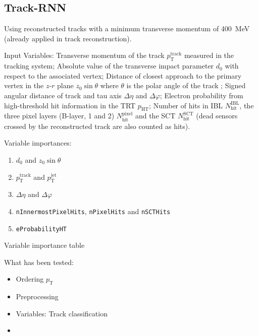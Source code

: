 \subsection{Track-RNN}
\label{sec:rnn_tracks}

Using reconstructed tracks with a minimum transverse momentum of
\SI{400}{\mega\electronvolt} (already applied in track reconstruction).

Input Variables: Transverse momentum of the track $p_\text{T}^\text{track}$
measured in the tracking system; Absolute value of the transverse impact
parameter $d_0$ with respect to the associated vertex; Distance of closest
approach to the primary vertex in the $z$-$r$ plane $z_0 \sin\theta$ where
$\theta$ is the polar angle of the track ; Signed angular distance of track and tau axis $\Delta \eta$ and
$\Delta \varphi$; Electron probability from high-threshold hit information in
the TRT $p_\text{HT}$; Number of hits in IBL $N_\text{hit}^\text{IBL}$, the
three pixel layers (B-layer, 1 and 2) $N_\text{hit}^\text{pixel}$ and the SCT
$N_\text{hit}^\text{SCT}$ (dead sensors crossed by the reconstructed track are
also counted as hits).

Variable importances:
\begin{enumerate}
\item $d_0$ and $z_0 \sin\theta$
\item $p_\text{T}^\text{track}$ and $p_\text{T}^\text{jet}$
\item $\Delta \eta$ and $\Delta \varphi$
\item \texttt{nInnermostPixelHits}, \texttt{nPixelHits} and \texttt{nSCTHits}
\item \texttt{eProbabilityHT}
\end{enumerate}

\begin{table}[ht]
  \centering
  
  \caption{Variable importance table}
\end{table}





What has been tested:
\begin{itemize}
\item Ordering $p_\text{T}$
\item Preprocessing
\item Variables: Track classification
\item
\end{itemize}

